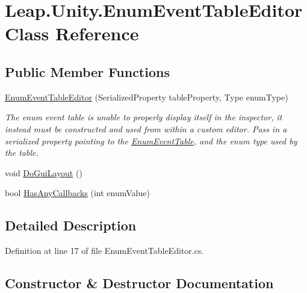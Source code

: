 \hypertarget{class_leap_1_1_unity_1_1_enum_event_table_editor}{}\section{Leap.\+Unity.\+Enum\+Event\+Table\+Editor Class Reference}
\label{class_leap_1_1_unity_1_1_enum_event_table_editor}
\subsection*{Public Member Functions}
\begin{DoxyCompactItemize}
\item 
\mbox{\hyperlink{class_leap_1_1_unity_1_1_enum_event_table_editor_a1a7649c2446793c07074cad9d0245779}{Enum\+Event\+Table\+Editor}} (Serialized\+Property table\+Property, Type enum\+Type)
\begin{DoxyCompactList}\small\item\em The enum event table is unable to properly display itself in the inspector, it instead must be constructed and used from within a custom editor. Pass in a serialized property pointing to the \mbox{\hyperlink{class_leap_1_1_unity_1_1_enum_event_table}{Enum\+Event\+Table}}, and the enum type used by the table. \end{DoxyCompactList}\item 
void \mbox{\hyperlink{class_leap_1_1_unity_1_1_enum_event_table_editor_a0750f6e4ebe155b598189387c896ade0}{Do\+Gui\+Layout}} ()
\item 
bool \mbox{\hyperlink{class_leap_1_1_unity_1_1_enum_event_table_editor_aa8e88f2c5b8385d9d99a2eb844aa7b27}{Has\+Any\+Callbacks}} (int enum\+Value)
\end{DoxyCompactItemize}


\subsection{Detailed Description}


Definition at line 17 of file Enum\+Event\+Table\+Editor.\+cs.



\subsection{Constructor \& Destructor Documentation}
\mbox{\label{class_leap_1_1_unity_1_1_enum_event_table_editor_a1a7649c2446793c07074cad9d0245779}} 
